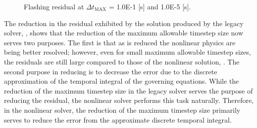 \begin{figure}[h!t]
\centering
{}
\caption[Flashing residual at $\Delta t_{\text{MAX}}$ = 1.0E-1 {[s]}and 1.0E-5 {[s]}]{Flashing residual at $\Delta t_{\text{MAX}}$ = 1.0E-1 {[s]} and 1.0E-5 {[s]}.}
\label{fig:flashing_compare_2}
\end{figure}

The reduction in the residual exhibited by the solution produced by the legacy solver, , shows that the reduction of the maximum allowable timestep size now serves two purposes.
The first is that as \dtmax{} is reduced the nonlinear physics are being better resolved; however, even for small maximum allowable timestep sizes, the residuals are still large compared to those of the nonlinear solution, .
The second purpose in reducing \dtmax{} is to decrease the error due to the discrete approximation of the temporal integral of the governing equations.
While the reduction of the maximum timestep size in the legacy solver serves the purpose of reducing the residual, the nonlinear solver performs this task naturally.
Therefore, in the nonlinear solver, the reduction of the maximum timestep size primarily serves to reduce the error from the approximate discrete temporal integral.

